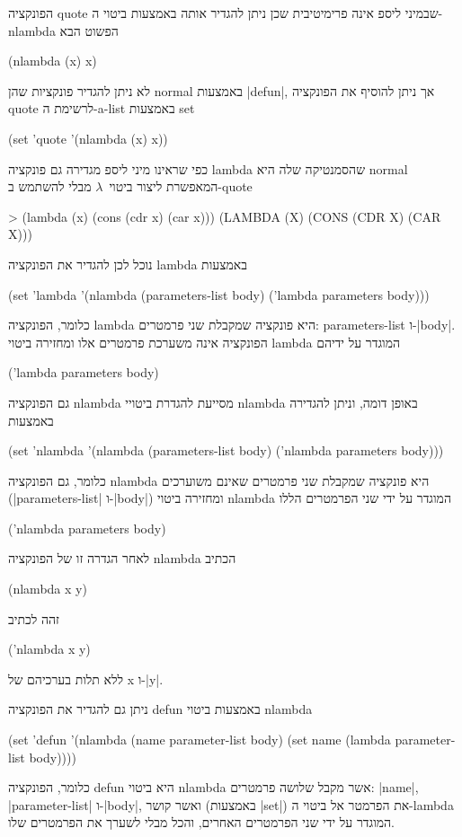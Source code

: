 הפונקציה quote שבמיני ליספ אינה פרימיטיבית שכן ניתן להגדיר אותה באמצעות ביטוי
ה-nlambda הפשוט הבא
\begin{LISP}
(nlambda (x) x)
\end{LISP}
לא ניתן להגדיר פונקציות שהן normal באמצעות \E|defun|, אך ניתן להוסיף את הפונקציה
quote לרשימת ה-a-list באמצעות set
\begin{LIBRARY}
(set 'quote
  '(nlambda (x) x))
\end{LIBRARY}
כפי שראינו מיני ליספ מגדירה גם פונקציה lambda שהסמנטיקה שלה היא normal המאפשרת
ליצור ביטוי~$λ$ מבלי להשתמש ב-quote
\begin{LISP}
> (lambda (x) (cons (cdr x) (car x)))
(LAMBDA (X) (CONS (CDR X) (CAR X)))
\end{LISP}
נוכל לכן להגדיר את הפונקציה lambda באמצעות
\begin{LIBRARY}
(set 'lambda
  '(nlambda (parameters-list body) ('lambda parameters body)))
\end{LIBRARY}
כלומר, הפונקציה lambda היא פונקציה שמקבלת שני פרמטרים: parameters-list
ו-\E|body|. הפונקציה אינה משערכת פרמטרים אלו ומחזירה ביטוי lambda המוגדר על ידיהם
\begin{LISP}
  ('lambda parameters body)
\end{LISP}
גם הפונקציה nlambda מסייעת להגדרת ביטויי nlambda באופן דומה, וניתן להגדירה
באמצעות
\begin{LIBRARY}
(set 'nlambda
  '(nlambda (parameters-list body) ('nlambda parameters body)))
\end{LIBRARY}
כלומר, גם הפונקציה nlambda היא פונקציה שמקבלת שני פרמטרים שאינם משוערכים
(\E|parameters-list| ו-\E|body|) ומחזירה ביטוי nlambda המוגדר על ידי
שני הפרמטרים הללו
\begin{LISP}
  ('nlambda parameters body)
\end{LISP}
לאחר הגדרה זו של הפונקציה nlambda הכתיב
\begin{LISP}
  (nlambda x y)
\end{LISP}
זהה לכתיב
\begin{LISP}
  ('nlambda x y)
\end{LISP}
ללא תלות בערכיהם של x ו-\E|y|.

ניתן גם להגדיר את הפונקציה defun באמצעות ביטוי nlambda
\begin{LIBRARY}
(set 'defun
  '(nlambda (name parameter-list body)
    (set name (lambda parameter-list body))))
\end{LIBRARY}
כלומר, הפונקציה defun היא ביטוי nlambda אשר מקבל שלושה פרמטרים: \E|name|,
\E|parameter-list| ו-\E|body|, ואשר קושר (באמצעות \E|set|) את הפרמטר אל ביטוי
ה-lambda המוגדר על ידי שני הפרמטרים האחרים, והכל מבלי לשערך את הפרמטרים שלו.

